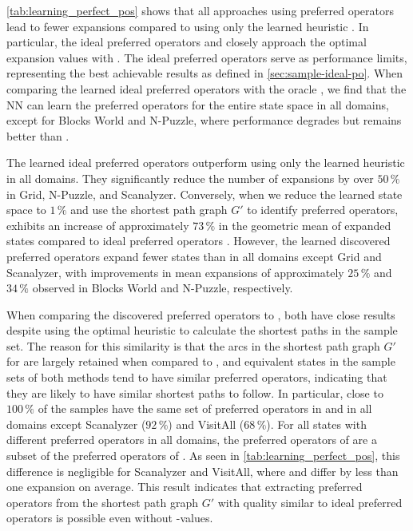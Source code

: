 \documentclass[ppgc,diss,english]{iiufrgs}
\begin{document}


\cref{tab:learning_perfect_pos} shows that all approaches using preferred operators lead to fewer expansions compared to using only the learned heuristic \hnn. In particular, the ideal preferred operators \postartable and \postar closely approach the optimal expansion values with \hstar.
The ideal preferred operators serve as performance limits, representing the best achievable results as defined in \cref{sec:sample-ideal-po}. When comparing the learned ideal preferred operators \postar with the oracle \postartable, we find that the NN can learn the preferred operators for the entire state space in all domains, except for Blocks World and N-Puzzle, where performance degrades but remains better than \hnn.

The learned ideal preferred operators \postar outperform using only the learned heuristic \hnn in all domains. They significantly reduce the number of expansions by over $50\,\%$ in Grid, N-Puzzle, and Scanalyzer. Conversely, when we reduce the learned state space to $1\,\%$ and use the shortest path graph $G'$ to identify preferred operators, \pog exhibits an increase of approximately $73\,\%$ in the geometric mean of expanded states compared to ideal preferred operators \postar. However, the learned discovered preferred operators \pog expand fewer states than \hnn in all domains except Grid and Scanalyzer, with improvements in mean expansions of approximately $25\,\%$ and $34\,\%$ observed in Blocks World and N-Puzzle, respectively.


When comparing the discovered preferred operators \pogstar to \pog, both have close results despite \pogstar using the optimal heuristic \hstar to calculate the shortest paths in the sample set. The reason for this similarity is that the arcs in the shortest path graph $G'$ for \pog are largely retained when compared to \pogstar, and equivalent states in the sample sets of both methods tend to have similar preferred operators, indicating that they are likely to have similar shortest paths to follow. In particular, close to $100\,\%$ of the samples have the same set of preferred operators in \pogstar and \pog in all domains except Scanalyzer ($92\,\%$) and VisitAll ($68\,\%$). For all states with different preferred operators in all domains, the preferred operators of \pog are a subset of the preferred operators of \pogstar. As seen in \cref{tab:learning_perfect_pos}, this difference is negligible for Scanalyzer and VisitAll, where \pogstar and \pog differ by less than one expansion on average. This result indicates that extracting preferred operators from the shortest path graph $G'$ with quality similar to ideal preferred operators is possible even without \hstar-values.
\end{document}
